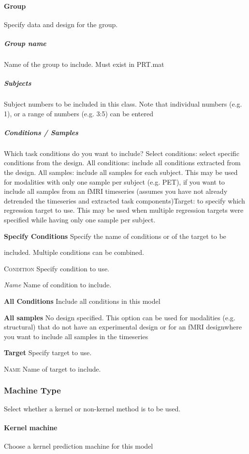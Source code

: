 \paragraph{Group}
Specify data and design for the group.


\subparagraph{Group name}
Name of the group to include. Must exist in PRT.mat


\subparagraph{Subjects}
Subject numbers to be included in this class. Note that individual numbers (e.g. 1), or a range of numbers (e.g. 3:5) can be entered


\subparagraph{Conditions / Samples}
Which task conditions do you want to include? Select conditions: select specific conditions from the design. All conditions: include all conditions extracted from the design. All samples: include all samples for each subject. This may be used for modalities with only one sample per subject (e.g. PET), if you want to include all samples from an fMRI timeseries (assumes you have not already detrended the timeseries and extracted task components)Target: to specify which regression target to use. This may be used when multiple regression targets were specified while having only one sample per subject.


\textbf{Specify Conditions}
Specify the name of conditions or of the target to be 

included. Multiple conditions can be combined.


\textsc{Condition}
Specify condition to use.


\textsl{Name}
Name of condition to include.


\textbf{All Conditions}
Include all conditions in this model


\textbf{All samples}
No design specified. This option can be used for modalities (e.g. structural) that do not have an experimental design or for an fMRI designwhere you want to include all samples in the timeseries


\textbf{Target}
Specify target to use.


\textsc{Name}
Name of target to include.


\subsubsection{Machine Type }
Select whether a kernel or non-kernel method is to be used.


\paragraph{Kernel machine}
Choose a kernel prediction machine for this model


